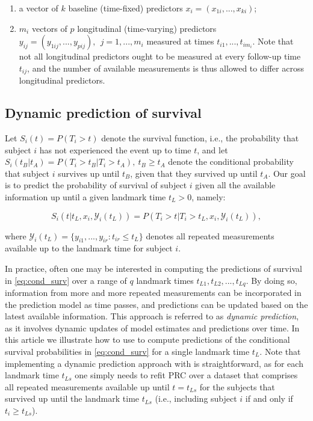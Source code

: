 \begin{enumerate}
\def\labelenumi{\arabic{enumi}.}
\tightlist
\item
  a vector of \(k\) baseline (time-fixed) predictors
  \(x_i = \left( x_{1i}, ..., x_{ki} \right)\);
\item
  \(m_i\) vectors of \(p\) longitudinal (time-varying) predictors
  \(y_{ij} = \left( y_{1ij}, ..., y_{pij} \right), \:\: j = 1,..., m_i\)
  measured at times \(t_{i1}, ..., t_{im_i}\). Note that not all
  longitudinal predictors ought to be measured at every follow-up time
  \(t_{ij}\), and the number of available measurements is thus allowed
  to differ across longitudinal predictors.
\end{enumerate}

\subsection{Dynamic prediction of
survival}\label{dynamic-prediction-of-survival}

Let \(S_i(t) = P(T_i > t)\) denote the survival function, i.e., the
probability that subject \(i\) has not experienced the event up to time
\(t\), and let
\(S_i(t_B | t_A) = P(T_i > t_B | T_i > t_A), \: t_B \geq t_A\) denote
the conditional probability that subject \(i\) survives up until
\(t_B\), given that they survived up until \(t_A\). Our goal is to
predict the probability of survival of subject \(i\) given all the
available information up until a given landmark time \(t_L > 0\),
namely:

\begin{equation}
S_i(t | t_L, x_i, \mathcal{Y}_i(t_L)) =  P(T_i > t | T_i > t_L, x_i, \mathcal{Y}_i(t_L)),
\label{eq:cond_surv}
\end{equation}

\noindent where
\(\mathcal{Y}_i(t_L) = \{ y_{i1}, ..., y_{ir}: t_{ir} \leq t_L \}\)
denotes all repeated measurements available up to the landmark time for
subject \(i\).

In practice, often one may be interested in computing the predictions of
survival in \eqref{eq:cond_surv} over a range of \(q\) landmark times
\(t_{L1}, t_{L2}, ..., t_{Lq}\). By doing so, information from more and
more repeated measurements can be incorporated in the prediction model
as time passes, and predictions can be updated based on the latest
available information. This approach is referred to as \emph{dynamic
prediction}, as it involves dynamic updates of model estimates and
predictions over time. In this article we illustrate how to use
 to compute predictions of the conditional survival
probabilities in \eqref{eq:cond_surv} for a single landmark time
\(t_L\). Note that implementing a dynamic prediction approach with
 is straightforward, as for each landmark time
\(t_{Ls}\) one simply needs to refit PRC over a dataset that comprises
all repeated measurements available up until \(t = t_{Ls}\) for the
subjects that survived up until the landmark time \(t_{Ls}\) (i.e.,
including subject \(i\) if and only if \(t_i \geq t_{Ls}\)).

